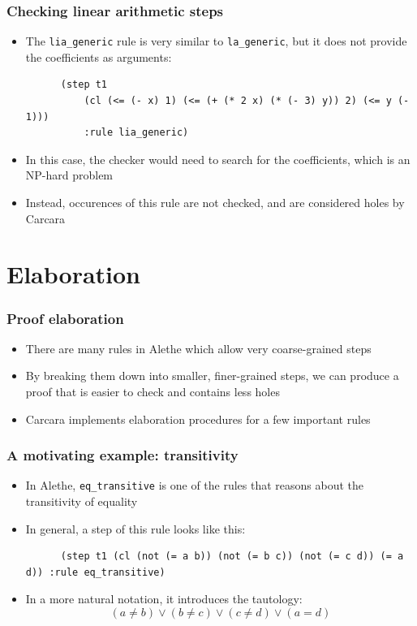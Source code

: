 \documentclass[usepdftitle=false,aspectratio=169]{beamer}
\newcommand\vitem{\vfill\item}
\begin{document}
\begin{frame}[fragile]
  \frametitle{Checking linear arithmetic steps}
  \begin{itemize}
    \item The \texttt{lia\_generic} rule is very similar to
    \texttt{la\_generic}, but it does not provide the coefficients as arguments:
    \begin{verbatim}
      (step t1
          (cl (<= (- x) 1) (<= (+ (* 2 x) (* (- 3) y)) 2) (<= y (- 1)))
          :rule lia_generic)
    \end{verbatim}
    \vitem In this case, the checker would need to search for the coefficients,
    which is an NP-hard problem
    \vitem Instead, occurences of this rule are not checked, and are considered
    holes by Carcara
  \end{itemize}
\end{frame}

\section{Elaboration}

\begin{frame}
  \frametitle{Proof elaboration}
  \begin{itemize}
    \item There are many rules in Alethe which allow very coarse-grained steps
    \vitem By breaking them down into smaller, finer-grained steps, we can
    produce a proof that is easier to check and contains less holes
    \vitem Carcara implements elaboration procedures for a few important rules
  \end{itemize}
\end{frame}

\begin{frame}[fragile]
  \frametitle{A motivating example: transitivity}
  \begin{itemize}
    \item In Alethe, \texttt{eq\_transitive} is one of the rules that reasons
    about the transitivity of equality
    \vitem In general, a step of this rule looks like this:
    \begin{verbatim}
      (step t1 (cl (not (= a b)) (not (= b c)) (not (= c d)) (= a d)) :rule eq_transitive)
    \end{verbatim}
    \vitem In a more natural notation, it introduces the tautology:
    $$(a \neq b) \lor (b \neq c) \lor (c \neq d) \lor (a = d)$$
  \end{itemize}
\end{frame}
\end{document}
